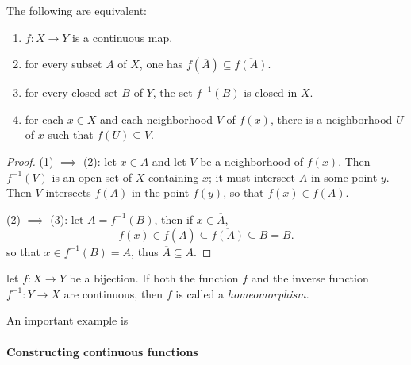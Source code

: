 \begin{theorem}
  The following are equivalent:
  \begin{enumerate}
    \item \( f: X \to Y \) is a continuous map.
    \item for every subset \( A \) of \( X \), one has \( f(\overline{A}) \subseteq \overline{f(A)} \).
    \item for every closed set \( B \) of \( Y \), the set \( f^{-1}(B) \) is closed in \( X \).
    \item for each \( x \in X \) and each neighborhood \( V \) of \( f(x) \), there is a neighborhood \( U \) of \( x \) such that \( f(U) \subseteq V \).
  \end{enumerate}
\end{theorem}
\begin{proof}
  (1) \( \implies \) (2): let \( x \in A \) and let \( V \) be a neighborhood of \( f(x) \).
  Then \( f^{-1}(V) \) is an open set of \( X \) containing \( x \); it must intersect \( A \) in some point \( y \).
  Then \( V \) intersects \( f(A) \) in the point \( f(y) \), so that \( f(x) \in \overline{f(A)} \).

  (2) \( \implies \) (3): let \( A = f^{-1}(B) \), then if \( x \in \overline{A} \),
  \[
    f(x) \in f(\overline{A}) \subseteq \overline{f(A)} \subseteq \overline{B} = B.
  \]
  so that \( x \in f^{-1}(B) = A \), thus \( \overline{A} \subseteq A \).
\end{proof}

\begin{definition}
  let \( f: X \to Y \) be a bijection.
  If both the function \( f \) and the inverse function \( f^{-1}: Y \to X \) are continuous, then \( f \) is called a \emph{homeomorphism}.
\end{definition}

\noindent An important example is
\begin{example}
\end{example}

\paragraph{Constructing continuous functions}

